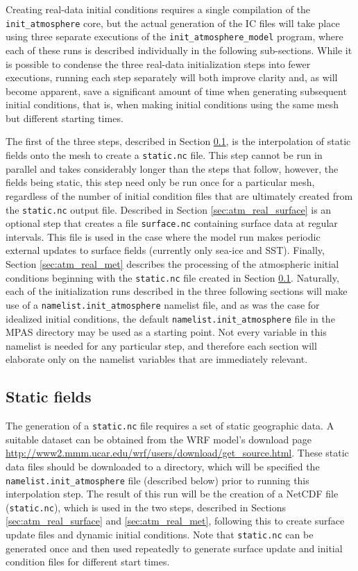 Creating real-data initial conditions requires a single compilation of the {\tt init\_atmosphere} core, but the actual generation of the IC files will take place using three separate executions of the {\tt init\_atmosphere\_model} program, where each of these runs is described individually in the following sub-sections.  While it is possible to condense the three real-data initialization steps into fewer executions, running each step separately will both improve clarity and, as will become apparent, save a significant amount of time when generating subsequent initial conditions, that is, when making initial conditions using the same mesh but different starting times.

The first of the three steps, described in Section \ref{sec:atm_real_static}, is the interpolation of static fields onto the mesh to create a {\tt static.nc} file.  This step cannot be run in parallel and takes considerably longer than the steps that follow, however, the fields being static, this step need only be run once for a particular mesh, regardless of the number of initial condition files that are ultimately created from the {\tt static.nc} output file.  Described in Section \ref{sec:atm_real_surface} is an optional step that creates a file {\tt surface.nc} containing surface data at regular intervals. This file is used in the case where the model run makes periodic external updates to surface fields (currently only sea-ice and SST).  Finally, Section \ref{sec:atm_real_met} describes the processing of the atmospheric initial conditions beginning with the {\tt static.nc} file created in Section \ref{sec:atm_real_static}.  Naturally, each of the initialization runs described in the three following sections will make use of a {\tt namelist.init\_atmosphere} namelist file, and as was the case for idealized initial conditions, the default {\tt namelist.init\_atmosphere} file in the MPAS directory may be used as a starting point.  Not every variable in this namelist is needed for any particular step, and therefore each section will elaborate only on the namelist variables that are immediately relevant.

\subsection{Static fields}
\label{sec:atm_real_static}

The generation of a {\tt static.nc} file requires a set of static geographic data.  A suitable dataset can be obtained from the WRF model's download page \\
 \url{http://www2.mmm.ucar.edu/wrf/users/download/get\_source.html}.  These static data files should be downloaded to a directory, which will be specified the {\tt namelist.init\_atmosphere} file (described below) prior to running this interpolation step.  The result of this run will be the creation of a NetCDF file ({\tt static.nc}), which is used in the two steps, described in Sections \ref{sec:atm_real_surface} and \ref{sec:atm_real_met}, following this to create surface update files and dynamic initial conditions.  Note that {\tt static.nc} can be generated once and then used repeatedly to generate surface update and initial condition files for different start times.

